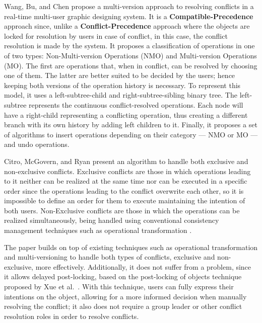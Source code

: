 Wang, Bu, and Chen \cite{Wang2002} propose a multi-version approach to resolving conflicts in a real-time multi-user graphic designing system. It is a \textbf{Compatible-Precedence} approach since, unlike a \textbf{Conflict-Precedence} approach where the objects are locked for resolution by users in case of conflict, in this case, the conflict resolution is made by the system. It proposes a classification of operations in one of two types: Non-Multi-version Operations (NMO) and Multi-version Operations (MO). The first are operations that, when in conflict, can be resolved by choosing one of them. The latter are better suited to be decided by the users; hence keeping both versions of the operation history is necessary.
To represent this model, it uses a left-subtree-child and right-subtree-sibling binary tree. The left-subtree represents the continuous conflict-resolved operations. Each node will have a right-child representing a conflicting operation, thus creating a different branch with its own history by adding left children to it. Finally, it proposes a set of algorithms to insert operations depending on their category --- NMO or MO --- and undo operations.

Citro, McGovern, and Ryan \cite{Citro2007} present an algorithm to handle both exclusive and non-exclusive conflicts. Exclusive conflicts are those in which operations leading to it neither can be realized at the same time nor can be executed in a specific order since the operations leading to the conflict overwrite each other, so it is impossible to define an order for them to execute maintaining the intention of both users. Non-Exclusive conflicts are those in which the operations can be realized simultaneously, being handled using conventional consistency management techniques such as operational transformation \cite{Ellis1989}.

The paper builds on top of existing techniques such as operational transformation and multi-versioning to handle both types of conflicts, exclusive and non-exclusive, more effectively. Additionally, it does not suffer from a  problem, since it allows delayed post-locking, based on the post-locking of objects technique proposed by Xue et al.\ \cite{Xue2001}. With this technique, users can fully express their intentions on the object, allowing for a more informed decision when manually resolving the conflict; it also does not require a group leader or other conflict resolution roles in order to resolve conflicts.

